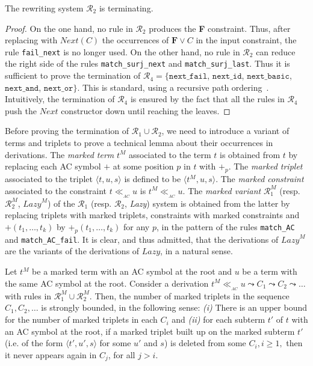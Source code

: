 \documentclass[submission,copyright,creativecommons]{eptcs}
\newcommand \matchth[3]{#1 {\ll}_{{ }_{#3}} {#2}}
\newcommand \matchAC[2]{\matchth{#1}{#2}{AC}}
\newcommand \trip[1]{\langle #1 \rangle}
\numberwithin{subcase}{case}
\begin{document}
\begin{lemma}\label{R2:termination:lemma}
The rewriting system $\mathcal{R}_2$ is terminating.
\end{lemma}
\begin{proof}
On the one hand, no rule in $\mathcal{R}_2$ produces the \textbf{F}
constraint. Thus, after replacing with $\textit{Next}(C)$ the occurrences of
$\textbf{F} \lor C$ in the input constraint, the rule \texttt{fail\_next} is no longer used.
On the other hand, no rule in $\mathcal{R}_2$ can reduce the right side of the
rules \texttt{match\_surj\_next} and \texttt{match\_surj\_last}. 
Thus it is sufficient to prove the termination of 
${\mathcal{R}}_4 = \{\texttt{next\_fail}$, $\texttt{next\_id}$,
 $\texttt{next\_basic}$, $\texttt{next\_and}$, $\texttt{next\_or}\}$.
This is standard, using a recursive path ordering~\cite{Dersh_Ordering82}.
Intuitively, the termination of ${\mathcal{R}}_4$ is ensured by the fact that all the rules
in ${\mathcal{R}}_4$ push the $\textit{Next}$ constructor down until reaching the leaves. 
\end{proof}

 Before proving the termination of
$\mathcal{R}_1\cup \mathcal{R}_2$, we need to introduce a variant of
terms and triplets to prove a technical lemma about their occurrences in
derivations.
The \emph{marked term} $t^{M}$ associated to the term $t$ is obtained from $t$ by
replacing each AC symbol $+$ at some position $p$ in $t$ with $+_p$. 
The
\emph{marked triplet} associated to the triplet $\trip{t,u,s}$ is defined to be
$\trip{t^M,u,s}$. The \emph{marked constraint} associated to the
constraint $\matchAC{t}{u}$ is $\matchAC{t^M}{u}$.
The \emph{marked variant} $\mathcal{R}_1^{M}$ (resp.
$\mathcal{R}_2^{M}$, $\textit{Lazy}^{M}$) of the $\mathcal{R}_1$ (resp.
$\mathcal{R}_2$, \textit{Lazy}) system is obtained from the latter by
replacing triplets with marked triplets, constraints with marked constraints and
$+(t_1,\ldots,t_k)$ by $+_p(t_1,\ldots,t_k)$ for any $p$, in the pattern  of the rules
\texttt{match\_AC} and \texttt{match\_AC\_fail}. It is clear, and thus admitted,
that the derivations of $\textit{Lazy}^{M}$ are the variants of the derivations
of $\textit{Lazy}$, in a natural sense. 

 
\begin{lemma}\label{bounded:triplet:lemma}
Let $t^M$ be a marked term with an AC symbol at the root and $u$ be a term with
the same AC symbol at the root. Consider a derivation $ \matchAC{t^M}{u}\leadsto
C_1 \leadsto C_2  \leadsto
 \ldots$ with rules in $\mathcal{R}_1^{M}\cup \mathcal{R}_2^{M}$. Then, the
 number of marked triplets in the sequence $C_1,C_2,\ldots$ is strongly bounded,
 in the following sense:
\emph{(i)} There is an upper bound for the number of marked triplets in each
$C_i$ and \emph{(ii)} for each subterm $t'$ of $t$ with an AC symbol at the root,
if a marked triplet built up on the marked subterm $t'$ (i.e. of the form
$\trip{t',u',s}$ for some $u'$ and $s$) is deleted from some $C_i,i\ge 1,$ then
it never appears again in $C_j$, for all $j>i$.
\end{lemma}
\end{document}
